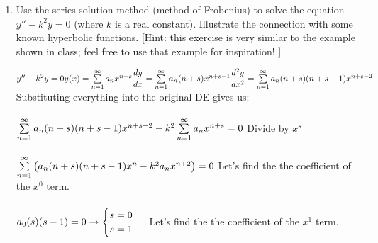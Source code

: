 \documentclass[fleqn]{article}
\begin{document}
\begin{enumerate}
      \vfill

    \item  Use the series solution method (method of Frobenius) to solve the equation $y'' - k^2 y =0$ (where $k$ is a real constant).  Illustrate the connection with some known hyperbolic functions. [Hint: this exercise is very similar to the example shown in class; feel free to use that example for inspiration! ]

      \textcolor{hwColor}{
        $
          y''-k^2y=0 \\
          \\
          y(x)=\sum\limits_{n=1}^{\infty} a_nx^{n+s} \\
          \\
         \dfrac{dy}{dx}=\sum\limits_{n=1}^{\infty} a_n(n+s)x^{n+s-1} \\
         \\
         \dfrac{d^2y}{dx^2}=\sum\limits_{n=1}^{\infty} a_n(n+s)(n+s-1)x^{n+s-2} \\
         \\
        $
        Substituting everything into the original DE gives us: \\
        \\
        $
          \sum\limits_{n=1}^{\infty} a_n(n+s)(n+s-1)x^{n+s-2}-k^2\sum\limits_{n=1}^{\infty} a_nx^{n+s}=0 \\
          \\
          \\
        $
        Divide by $x^s$ \\
        \\
        $
          \sum\limits_{n=1}^{\infty} \left(a_n(n+s)(n+s-1)x^n-k^2a_nx^{n+2}\right)=0 \\
          \\
          \\
          \\
        $
        Let's find the the coefficient of the $x^0$ term. \\
        \\
        $
          a_0(s)(s-1)=0 \rightarrow \begin{cases}
            s=0 \\
            s=1
          \end{cases} \\
          \\
          \\
        $
        Let's find the the coefficient of the $x^1$ term. \\
}
\end{enumerate}
\end{document}
